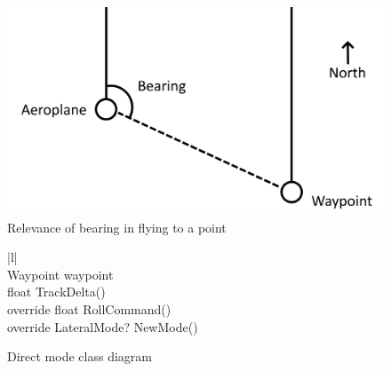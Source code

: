 \documentclass{article}
\begin{document}
\begin{figure}[H]
\centering
\includegraphics{diagrams/directto.png}
\caption{\label{fig:directto}Relevance of bearing in flying to a point}
\end{figure}

\begin{figure}[H]
\centering
\begin{tabular}{ |l| } 
\hline
{} \\
\hline
Waypoint waypoint \\
\hline
float TrackDelta() \\
override float RollCommand() \\
override LateralMode? NewMode() \\
\hline
\end{tabular}
\caption{\label{fig:directmodeclass}Direct mode class diagram}
\end{figure}
\end{document}
